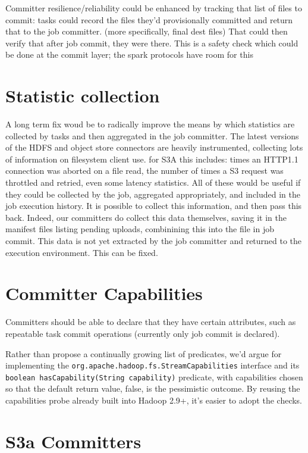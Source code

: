 \documentclass{article}
\begin{document}
Committer resilience/reliability could be enhanced by tracking that list of
files to commit: tasks could record the files they'd provisionally committed and return
that to the job committer. (more specifically, final dest files)
That could then verify that after job commit, they were there.
This is a safety check which could be done at the commit layer; the spark protocols
have room for this


\section{Statistic collection}

A long term fix woud be to radically improve the means by which statistics are
collected by tasks and then aggregated in the job committer.
The latest versions of the HDFS and object store connectors are heavily instrumented,
collecting lots of information on filesystem client use.
for S3A this includes: times an HTTP1.1 connection was aborted on a file read,
the number of times a S3 request was throttled and retried,
even some latency statistics.
All of these would be useful if they could be collected by the job, aggregated
appropriately, and included in the job execution history.
It is possible to collect this information, and then pass this back.
Indeed, our committers do collect this data themselves, saving it in the
manifest files listing pending uploads, combinining this into the \SUCCESS file
in job commit.
This data is not yet extracted by the job committer and returned to the execution
environment.
This can be fixed.

\section{Committer Capabilities}

Committers should be able to declare that they have certain attributes, such
as repeatable task commit operations (currently only job commit is declared).

Rather than propose a continually growing list of predicates, we'd argue for
implementing the \texttt{org.apache.hadoop.fs.StreamCapabilities} interface
and its \texttt{boolean hasCapability(String capability)} predicate, with capabilities
chosen so that the default return value, false, is the pessimistic outcome.
By reusing the capabilities probe already built into Hadoop 2.9+, it's  easier
to adopt the checks.



\section{S3a Committers}
\end{document}
